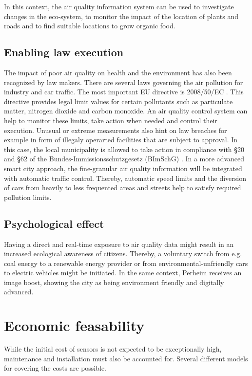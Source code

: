 \documentclass[conference]{IEEEtran}
\begin{document}
In this context, the air quality information system can be used to investigate changes in the eco-system, to monitor the impact of the location of plants and roads and to find suitable locations to grow organic food.

\subsection{Enabling law execution}
The impact of poor air quality on health and the environment has also been recognized by law makers. There are several laws governing the air pollution for industry and car traffic. The most important EU directive is 2008/50/EC \cite{EurpoeanUnion.2008}. This directive provides legal limit values for certain pollutants such as particulate matter, nitrogen dioxide and carbon monoxide. An air quality control system can help to monitor these limits, take action when needed and control their execution. Unusual or extreme measurements also hint on law breaches for example in form of illegaly operarted facilities that are subject to approval. In this case, the local municipality is allowed to take action in compliance with \S20 and \S62 of the Bundes-Immissionsschutzgesetz (BImSchG) \cite{BundesrepublikDeutschland.1974}. In a more advanced smart city approach, the fine-granular air quality information will be integrated with automatic traffic control. Thereby, automatic speed limits and the diversion of cars from heavily to less frequented areas and streets help to satisfy required pollution limits.

\subsection{Psychological effect}
Having a direct and real-time exposure to air quality data might result in an increased ecological awareness of citizens. Thereby, a voluntary switch from e.g. coal energy to a renewable energy provider or from environmental-unfriendly cars to electric vehicles might be initiated. In the same context, Perheim receives an image boost, showing the city as being environment friendly and digitally advanced.

\section{Economic feasability}
While the initial cost of sensors is not expected to be exceptionally high, maintenance and installation must also be accounted for. Several different models for covering the costs are possible.
\end{document}
